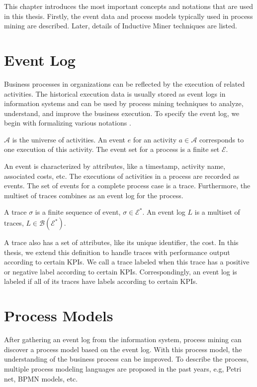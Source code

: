 This chapter introduces the most important concepts and notations that are used in this thesis. Firstly, the event data and process models typically used in process mining are described. Later, details of Inductive Miner techniques  are listed.
\section{Event Log}
Business processes in organizations can be reflected by the execution of related activities. The historical execution data is usually stored as event logs in information systems and can be used by process mining techniques to analyze, understand, and improve the business execution. To specify the event log, we begin with formalizing  various notations \cite{van2016data} .
\begin{definition}[Event]
$\mathcal{A}$ is the universe of activities. An event $e$ for an activity  $a \in \mathcal{A}$ corresponds to one execution of this activity. The event set for a process is a finite set $\mathcal{E}$. 
\end{definition}
An event is characterized by attributes, like a timestamp, activity name, associated costs, etc. The executions of activities in a process are recorded as events. The set of events for a complete process case is a trace. Furthermore, the multiset of traces combines as an event log for the process. 


\begin{definition}
A trace $\sigma$ is a finite sequence of event, $\sigma \in \mathcal{E}^*$. An event log $L$ is a multiset of traces, $L \in \mathcal{B(\mathcal{E}^*)}$. 
\end{definition}
A trace also has a set of attributes, like its unique identifier, the cost. In this thesis, we extend this definition to handle traces with performance output according to certain KPIs. We call a trace labeled when this trace has a positive or negative label according to certain KPIs. Correspondingly, an event log is labeled if all of its traces have labels according to certain KPIs.
\section{Process Models}
After gathering an event log from the information system, process mining can discover a process model based on the event log. With this process model, the understanding of the business process can be improved. To describe the process, multiple process modeling languages are proposed in the past years, e.g, Petri net, BPMN models, etc. 

